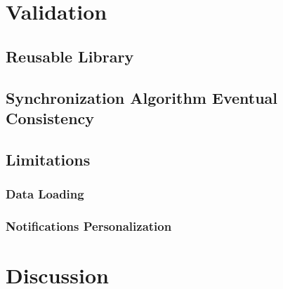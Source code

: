 \documentclass{acm_proc_article-sp}
\begin{document}
\section{Validation}

\subsection{Reusable Library}

\subsection{Synchronization Algorithm Eventual Consistency}

\subsection{Limitations}

\subsubsection{Data Loading}

\subsubsection{Notifications Personalization}

\section{Discussion}

\balancecolumns
\end{document}
